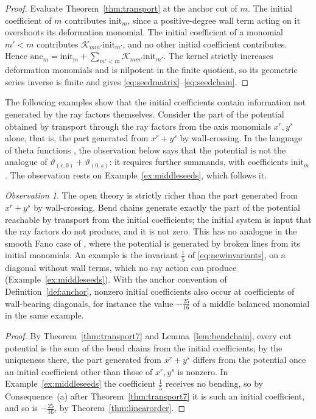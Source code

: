 \documentclass[11pt]{amsart}
\theoremstyle{definition}
\theoremstyle{remark}
\newtheorem{observation}[theorem]{Observation}
\begin{document}
\begin{proof}
Evaluate Theorem~\ref{thm:transport} at the anchor cut of $m$.  The initial
coefficient of $m$ contributes $\mathrm{init}_m$, since a positive-degree wall
term acting on it overshoots its deformation monomial.  The initial coefficient
of a monomial $m'<m$ contributes $\mathcal K_{mm'}\mathrm{init}_{m'}$, and no
other initial coefficient contributes.  Hence
$\mathrm{anc}_m=\mathrm{init}_m+\sum_{m'<m}\mathcal K_{mm'}\mathrm{init}_{m'}$.
The kernel strictly increases
deformation monomials and is nilpotent in the finite quotient, so its geometric
series inverse is finite and gives
\eqref{eq:seedmatrix}--\eqref{eq:seedchain}.  \qedhere
\end{proof}

The following examples show that the initial coefficients contain
information not generated by the ray factors themselves.  Consider the part of
the potential obtained by transport through the ray factors from the axis
monomials $x^r,y^s$ alone, that is, the part generated from $x^r+y^s$ by
wall-crossing.  In the language of theta functions \cite{GHK15,GHKK}, the
observation below says
that the potential is not the analogue of
$\vartheta_{(r,0)}+\vartheta_{(0,s)}$: it requires further summands, with
coefficients $\mathrm{init}_m$.  The observation rests on
Example~\ref{ex:middleseeds}, which follows it.
\begin{observation}
\label{obs:richer}
The open theory is strictly richer than the part generated from $x^r+y^s$ by
wall-crossing. Bend chains generate
exactly the part of the potential reachable by transport from the initial
coefficients; the initial system is input that the
ray factors do not produce, and it is not zero. This has no analogue in the
smooth Fano case of \cite{Gross10,CPS}, where the potential is generated by
broken lines from its initial monomials. An example is the invariant $\tfrac15$ of
\eqref{eq:newinvariants}, on a diagonal without wall terms, which no ray action
can produce (Example~\ref{ex:middleseeds}).  With the anchor convention of
Definition~\ref{def:anchor}, nonzero initial coefficients also occur at
coefficients of wall-bearing diagonals, for instance the value $-\tfrac{25}{16}$ of a middle
balanced monomial in the same example.
\end{observation}

\begin{proof}
By Theorem~\ref{thm:transport7} and Lemma~\ref{lem:bendchain}, every cut
potential is the sum of the bend chains from the initial coefficients; by the
uniqueness there, the part generated from $x^r+y^s$ differs from the potential
once an initial coefficient other than those of $x^r,y^s$ is nonzero.  In
Example~\ref{ex:middleseeds} the coefficient $\tfrac15$ receives no bending,
so by Consequence~(a) after Theorem~\ref{thm:transport7} it is such an initial
coefficient, and so is $-\tfrac{25}{16}$, by Theorem~\ref{thm:linearorder}.
\end{proof}
\end{document}
